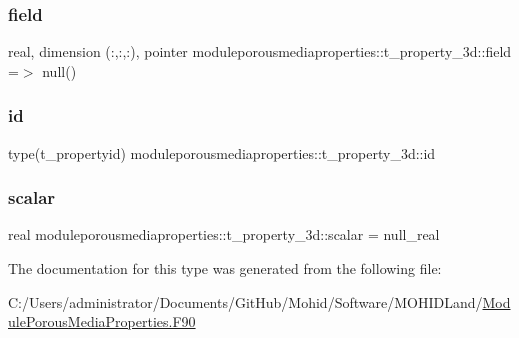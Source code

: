 \subsubsection{\texorpdfstring{field}{field}}
{\footnotesize\ttfamily real, dimension (\+:,\+:,\+:), pointer moduleporousmediaproperties\+::t\+\_\+property\+\_\+3d\+::field =$>$ null()\hspace{0.3cm}{\ttfamily [private]}}

\mbox{\label{structmoduleporousmediaproperties_1_1t__property__3d_a4971e8f69509f1d303edfa0626220723}} 
\subsubsection{\texorpdfstring{id}{id}}
{\footnotesize\ttfamily type(t\+\_\+propertyid) moduleporousmediaproperties\+::t\+\_\+property\+\_\+3d\+::id\hspace{0.3cm}{\ttfamily [private]}}

\mbox{\label{structmoduleporousmediaproperties_1_1t__property__3d_af5056850ac986fe1a2035f2aa29eada9}} 
\subsubsection{\texorpdfstring{scalar}{scalar}}
{\footnotesize\ttfamily real moduleporousmediaproperties\+::t\+\_\+property\+\_\+3d\+::scalar = null\+\_\+real\hspace{0.3cm}{\ttfamily [private]}}



The documentation for this type was generated from the following file\+:\begin{DoxyCompactItemize}
\item 
C\+:/\+Users/administrator/\+Documents/\+Git\+Hub/\+Mohid/\+Software/\+M\+O\+H\+I\+D\+Land/\mbox{\hyperlink{_module_porous_media_properties_8_f90}{Module\+Porous\+Media\+Properties.\+F90}}\end{DoxyCompactItemize}
